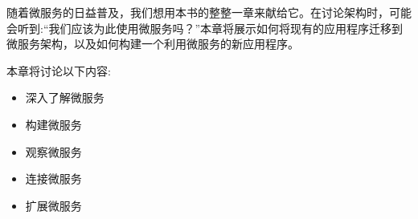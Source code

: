 
随着微服务的日益普及，我们想用本书的整整一章来献给它。在讨论架构时，可能会听到:“我们应该为此使用微服务吗？”本章将展示如何将现有的应用程序迁移到微服务架构，以及如何构建一个利用微服务的新应用程序。

本章将讨论以下内容:

\begin{itemize}
\item 
深入了解微服务

\item 
构建微服务

\item 
观察微服务

\item 
连接微服务

\item 
扩展微服务
\end{itemize}